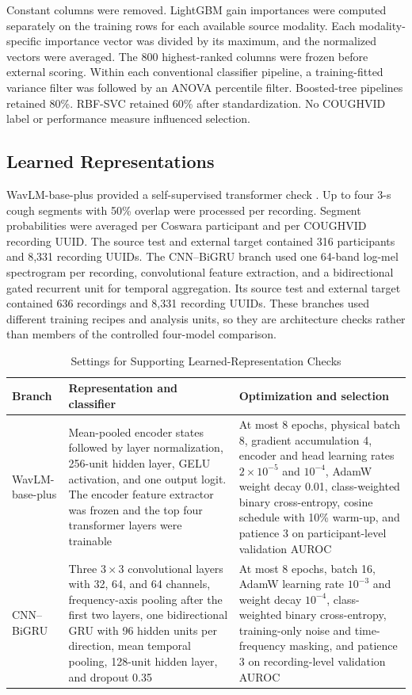 \documentclass[journal]{IEEEtran}
\begin{document}
Constant columns were removed. LightGBM gain importances were computed separately on the training rows for each available source modality. Each modality-specific importance vector was divided by its maximum, and the normalized vectors were averaged. The 800 highest-ranked columns were frozen before external scoring. Within each conventional classifier pipeline, a training-fitted variance filter was followed by an ANOVA percentile filter. Boosted-tree pipelines retained 80\%. RBF-SVC retained 60\% after standardization. No COUGHVID label or performance measure influenced selection.

\subsection{Learned Representations}

WavLM-base-plus provided a self-supervised transformer check \cite{wang2022wavlm}. Up to four 3-s cough segments with 50\% overlap were processed per recording. Segment probabilities were averaged per Coswara participant and per COUGHVID recording UUID. The source test and external target contained 316 participants and 8,331 recording UUIDs. The CNN--BiGRU branch used one 64-band log-mel spectrogram per recording, convolutional feature extraction, and a bidirectional gated recurrent unit for temporal aggregation. Its source test and external target contained 636 recordings and 8,331 recording UUIDs. These branches used different training recipes and analysis units, so they are architecture checks rather than members of the controlled four-model comparison.

\begin{table}[t]
\caption{Settings for Supporting Learned-Representation Checks}
\label{tab:s_learned_settings}
\centering
\footnotesize
\begin{tabular}{L{2.4cm}L{5.2cm}L{5.8cm}}
\toprule
Branch & Representation and classifier & Optimization and selection \\
\midrule
WavLM-base-plus & Mean-pooled encoder states followed by layer normalization, 256-unit hidden layer, GELU activation, and one output logit. The encoder feature extractor was frozen and the top four transformer layers were trainable & At most 8 epochs, physical batch 8, gradient accumulation 4, encoder and head learning rates $2\times10^{-5}$ and $10^{-4}$, AdamW weight decay 0.01, class-weighted binary cross-entropy, cosine schedule with 10\% warm-up, and patience 3 on participant-level validation AUROC \\
CNN--BiGRU & Three $3\times3$ convolutional layers with 32, 64, and 64 channels, frequency-axis pooling after the first two layers, one bidirectional GRU with 96 hidden units per direction, mean temporal pooling, 128-unit hidden layer, and dropout 0.35 & At most 8 epochs, batch 16, AdamW learning rate $10^{-3}$ and weight decay $10^{-4}$, class-weighted binary cross-entropy, training-only noise and time-frequency masking, and patience 3 on recording-level validation AUROC \\
\bottomrule
\end{tabular}
\end{table}
\end{document}
